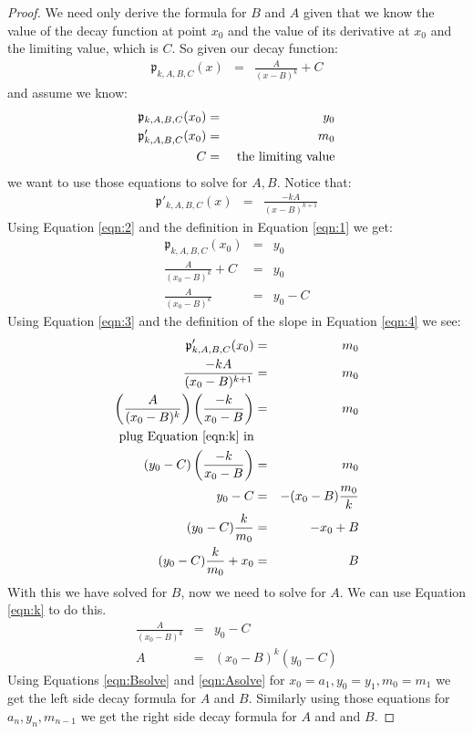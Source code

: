 \documentclass[10pt]{article}
\begin{document}
\begin{proof}
We need only derive the formula for $B$ and $A$ given that we know the value
of the decay function at point $x_0$ and the value of its derivative
at $x_0$ and the limiting value, which is $C$.  So given our decay function:
\begin{eqnarray}
\label{eqn:1}
\mathfrak{p}_{k,A,B,C}(x)&=&\frac{A}{(x-B)^k} + C
\end{eqnarray}
and assume we know:
\begin{eqnarray}
\label{eqn:2}\mathfrak{p}_{k,A,B,C}(x_0)&=&y_0 \\
\label{eqn:3}\mathfrak{p}'_{k,A,B,C}(x_0)&=&m_0 \\
C&=&\hbox{ the limiting value}
\end{eqnarray}
we want to use those equations to solve for $A, B$. Notice that:
\begin{eqnarray}
\label{eqn:4}\mathfrak{p}'_{k,A,B,C}(x) &=& \frac{-kA}{(x-B)^{k+1}}
\end{eqnarray}
Using Equation \ref{eqn:2} and the definition in Equation \ref{eqn:1} we get:
\begin{eqnarray}
\mathfrak{p}_{k,A,B,C}(x_0)&=&y_0 \\
\frac{A}{(x_0-B)^k} +C &=& y_0 \\ \label{eqn:k}
\frac{A}{(x_0-B)^k} &=& y_0 - C
\end{eqnarray}
Using Equation \ref{eqn:3} and the definition of the slope in Equation
\ref{eqn:4} we see:
\begin{eqnarray}
\mathfrak{p}'_{k,A,B,C}(x_0)&=&m_0 \\
\frac{-kA}{(x_0-B)^{k+1}}&=&m_0 \\
\left(\frac{A}{(x_0-B)^{k}}\right) \left( \frac{-k}{x_0-B} \right) &=&m_0 \\
\hbox{plug Equation \ref{eqn:k} in} \\
\left(y_0-C\right)\left( \frac{-k}{x_0-B} \right) &=& m_0 \\
y_0-C &=& -(x_0-B)\frac{m_0}{k} \\
(y_0-C)\frac{k}{m_0}&=&-x_0+B \\
\label{eqn:Bsolve}(y_0-C)\frac{k}{m_0}+x_0&=&B
\end{eqnarray}
With this we have solved for $B$, now we need to solve for $A$.  We can use
Equation \ref{eqn:k} to do this.
\begin{eqnarray}
\frac{A}{(x_0-B)^k} &=& y_0 - C \\
\label{eqn:Asolve} A &=& (x_0-B)^k(y_0-C)
\end{eqnarray}
Using Equations \ref{eqn:Bsolve} and \ref{eqn:Asolve} for $x_0=a_1, y_0=y_1, m_0=m_1$ we
get the left side decay formula for $A$ and $B$.  Similarly using those equations for
$a_n, y_n, m_{n-1}$ we get the right side decay formula for $A$ and and $B$.
\end{proof}
\end{document}
